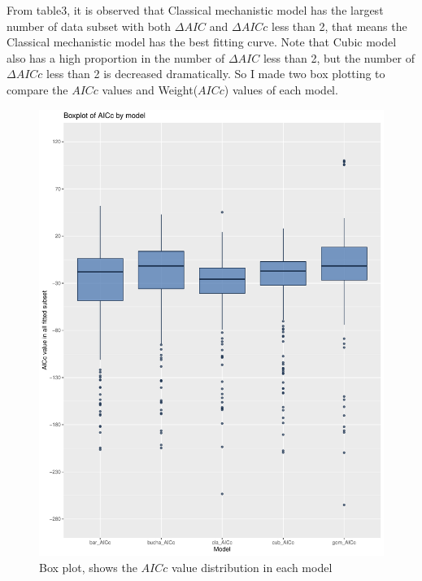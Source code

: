 \documentclass[11pt]{article}
\begin{document}
From table3, it is observed that Classical mechanistic model has the largest number of data subset with both $\Delta$$AIC$ and  $\Delta$$AICc$ less than 2, that means the Classical mechanistic model has the best fitting curve. Note that Cubic model also has a high proportion in the number of $\Delta$$AIC$ less than 2, but the number of $\Delta$$AICc$ less than 2 is decreased dramatically. So I made two box plotting to compare the $AICc$ values and Weight($AICc$) values of each model. 

\begin{figure}[H]
    \centering
	\includegraphics[width = \textwidth]{../results/images/boxplot.pdf}
    \caption{Box plot, shows the $AICc$ value distribution in each model}
    \label{fig6}
\end{figure}
\end{document}
